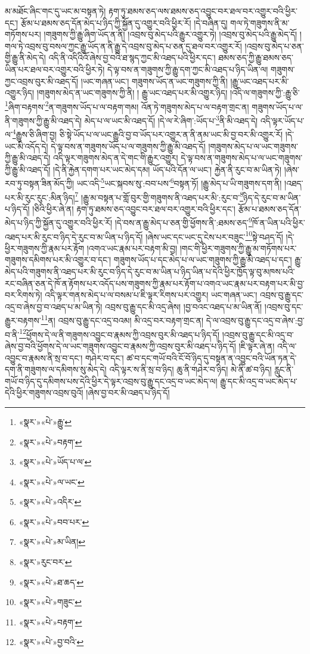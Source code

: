 མ་མཐོང་ཞིང་གང་དུ་ཡང་མ་བསྟན་ཏེ། རྟག་ཏུ་ཐམས་ཅད་ལས་ཐམས་ཅད་འབྱུང་བར་ཐལ་བར་འགྱུར་བའི་ཕྱིར་དང་། རྩོམ་པ་ཐམས་ཅད་དོན་མེད་པ་ཉིད་ཀྱི་སྐྱོན་དུ་འགྱུར་བའི་ཕྱིར་རོ། །དེ་བཞིན་དུ། གལ་ཏེ་གཟུགས་ནི་མ་གཏོགས་པར། །གཟུགས་ཀྱི་རྒྱུ་ཞིག་ཡོད་ན་ནི། །འབྲས་བུ་མེད་པའི་རྒྱུར་འགྱུར་ཏེ། །འབྲས་བུ་མེད་པའི་རྒྱུ་མེད་དོ། །གལ་ཏེ་འབྲས་བུ་བསལ་ཀྱང་རྒྱུ་ཡོད་ན་ནི་རྒྱུ་དེ་འབྲས་བུ་མེད་པ་ཅན་དུ་ཐལ་བར་འགྱུར་རོ། །འབྲས་བུ་མེད་པ་ཅན་གྱི་རྒྱུ་ནི་མེད་དེ། འདི་ནི་འདིའིའོ་ཞེས་བྱ་བའི་ཐ་སྙད་ཀྱང་མི་འཐད་པའི་ཕྱིར་དང་། ཐམས་ཅད་ཀྱི་རྒྱུ་ཐམས་ཅད་ཡིན་པར་ཐལ་བར་འགྱུར་བའི་ཕྱིར་ཏེ། དེ་ལྟ་བས་ན་གཟུགས་ཀྱི་རྒྱུ་དག་ཀྱང་མི་འཐད་པ་ཉིད་ཡིན་ལ། གཟུགས་ཀྱང་འབྲས་བུར་མི་འཐད་དོ། །ཡང་གཞན་ཡང་། གཟུགས་ཡོད་ན་ཡང་གཟུགས་ཀྱི་ནི། །རྒྱུ་ཡང་འཐད་པར་མི་འགྱུར་ཉིད། །གཟུགས་མེད་ན་ཡང་གཟུགས་ཀྱི་ནི། །
རྒྱུ་ཡང་འཐད་པར་མི་འགྱུར་ཉིད། །འདི་ལ་གཟུགས་ཀྱི་:རྒྱུ་ཅི་\footnote{«སྣར་»«པེ་»རྒྱུ་}ཞིག་བརྟགས་\footnote{«སྣར་»«པེ་»བརྟག་}ན་གཟུགས་ཡོད་པ་ལ་བརྟག་གམ། འོན་ཏེ་གཟུགས་མེད་པ་ལ་བརྟག་གྲང་ན། གཟུགས་ཡོད་པ་ལ་ནི་གཟུགས་ཀྱི་རྒྱུ་མི་འཐད་དེ། མེད་པ་ལ་ཡང་མི་འཐད་དོ། །དེ་ལ་རེ་ཞིག་:ཡོད་པ་\footnote{«སྣར་»«པེ་»ཡོད་པ་ལ་}ནི་མི་འཐད་དེ། འདི་ལྟར་ཡོད་པ་ལ་\footnote{«སྣར་»«པེ་»ལ་ཡང་}རྒྱུས་ཅི་ཞིག་བྱ། ཅི་སྟེ་ཡོད་པ་ལ་ཡང་རྒྱུའི་བྱ་བ་ཡོད་པར་འགྱུར་ན་ནི་ནམ་ཡང་མི་བྱ་བར་མི་འགྱུར་རོ། །དེ་ཡང་མི་འདོད་དེ། དེ་ལྟ་བས་ན་གཟུགས་ཡོད་པ་ལ་གཟུགས་ཀྱི་རྒྱུ་མི་འཐད་དོ། །གཟུགས་མེད་པ་ལ་ཡང་གཟུགས་ཀྱི་རྒྱུ་མི་འཐད་དེ། འདི་ལྟར་གཟུགས་མེད་ན་དེ་གང་གི་རྒྱུར་འགྱུར། དེ་ལྟ་བས་ན་གཟུགས་མེད་པ་ལ་ཡང་གཟུགས་ཀྱི་རྒྱུ་མི་འཐད་དོ། །དེ་ནི་རྐྱེན་དགག་པར་ཡང་མེད་དམ། ཡོད་པའི་དོན་ལ་ཡང་། རྐྱེན་ནི་རུང་བ་མ་ཡིན་ཏེ། །ཞེས་རབ་ཏུ་བསྟན་ཟིན་མོད་ཀྱི། ཡང་འདི་\footnote{«སྣར་»«པེ་»འདིར་}ཡང་སྐབས་སུ་:བབ་པས་\footnote{«སྣར་»«པེ་»བབ་པར་}བསྟན་ཏོ། །རྒྱུ་མེད་པ་ཡི་གཟུགས་དག་ནི། །འཐད་པར་མི་རུང་རུང་:མིན་ཉིད།\footnote{«སྣར་»«པེ་»མ་ཡིན།} །རྒྱུ་མ་བསྟན་པ་གློ་བུར་གྱི་གཟུགས་ནི་འཐད་པར་མི་:རུང་བ་\footnote{«སྣར་»རུང་བར་}ཉིད་དེ་རུང་བ་མ་ཡིན་པ་ཉིད་དོ། །ཅིའི་ཕྱིར་ཞེ་ན། རྟག་ཏུ་ཐམས་ཅད་འབྱུང་བར་ཐལ་བར་འགྱུར་བའི་ཕྱིར་དང་། རྩོམ་པ་ཐམས་ཅད་དོན་མེད་པ་ཉིད་ཀྱི་སྐྱོན་དུ་འགྱུར་བའི་ཕྱིར་རོ། །དེ་བས་ན་རྒྱུ་མེད་པ་ཅན་གྱི་ཕྱོགས་ནི་:ཐམས་ཅད་\footnote{«སྣར་»«པེ་»ཐ་ཆད་}ཁོ་ན་ཡིན་པའི་ཕྱིར་འཐད་པར་མི་རུང་བ་ཉིད་དེ་རུང་བ་མ་ཡིན་པ་ཉིད་དོ། །ཞེས་ཡང་དང་ཡང་དུ་ངེས་པར་བཟུང་\footnote{«སྣར་»«པེ་»གཟུང་}སྟེ་བཤད་དོ། །དེ་ཕྱིར་གཟུགས་ཀྱི་རྣམ་པར་རྟོག །འགའ་ཡང་རྣམ་པར་བརྟག་མི་བྱ། །གང་གི་ཕྱིར་གཟུགས་ཀྱི་རྒྱུ་མ་གཏོགས་པར་གཟུགས་དམིགས་པར་མི་འགྱུར་བ་དང་། གཟུགས་ཡོད་པ་དང་མེད་པ་ལ་ཡང་གཟུགས་ཀྱི་རྒྱུ་མི་འཐད་པ་དང་། རྒྱུ་མེད་པའི་གཟུགས་ནི་འཐད་པར་མི་རུང་བ་ཉིད་དེ་རུང་བ་མ་ཡིན་པ་ཉིད་ཡིན་པ་དེའི་ཕྱིར་ཁྱོད་ལྟ་བུ་མཁས་པའི་རང་བཞིན་ཅན་དེ་ཁོ་ན་རྟོགས་པར་འདོད་པས་གཟུགས་ཀྱི་རྣམ་པར་རྟོག་པ་འགའ་ཡང་རྣམ་པར་བརྟག་པར་མི་བྱ་བར་རིགས་ཏེ། འདི་ལྟར་གནས་མེད་པ་ལ་བསམ་པ་ཇི་ལྟར་རིགས་པར་འགྱུར། ཡང་གཞན་ཡང་། འབྲས་བུ་རྒྱུ་དང་འདྲ་བ་ཞེས་བྱ་བ་འཐད་པ་མ་ཡིན་ཏེ། འབྲས་བུ་རྒྱུ་དང་མི་འདྲ་ཞེས། །བྱ་བའང་འཐད་པ་མ་ཡིན་ནོ། །འབྲས་བུ་དང་རྒྱུར་བརྟགས་\footnote{«སྣར་»«པེ་»བརྟག་}ན། འབྲས་བུ་རྒྱུ་དང་འདྲ་བའམ། མི་འདྲ་བར་བརྟག་གྲང་ན། དེ་ལ་འབྲས་བུ་རྒྱུ་དང་འདྲ་བ་ཞེས་:བྱ་བ་ནི་\footnote{«སྣར་»«པེ་»བྱ་བའི་}ཕྱོགས་དེ་ལ་ནི་གཟུགས་འབྱུང་བ་རྣམས་ཀྱི་འབྲས་བུར་མི་འཐད་པ་ཉིད་དོ། །འབྲས་བུ་རྒྱུ་དང་མི་འདྲ་བ་ཞེས་བྱ་བའི་ཕྱོགས་དེ་ལ་ཡང་གཟུགས་འབྱུང་བ་རྣམས་ཀྱི་འབྲས་བུར་མི་འཐད་པ་ཉིད་དོ། །ཇི་ལྟར་ཞེ་ན། འདི་ལ་འབྱུང་བ་རྣམས་ནི་སྲ་བ་དང་། གཤེར་བ་དང་། ཚ་བ་དང་གཡོ་བའི་ངོ་བོ་ཉིད་དུ་བསྟན་ན་འབྱུང་བའི་ཡོན་ཏན་དེ་དག་ནི་གཟུགས་ལ་དམིགས་སུ་མེད་དེ། འདི་ལྟར་ས་ནི་སྲ་བ་ཉིད། ཆུ་ནི་གཤེར་བ་ཉིད། མེ་ནི་ཚ་བ་ཉིད། རླུང་ནི་གཡོ་བ་ཉིད་དུ་དམིགས་པས་དེའི་ཕྱིར་དེ་ལྟར་འབྲས་བུ་རྒྱུ་དང་འདྲ་བ་ཡང་མེད་ལ། རྒྱུ་དང་མི་འདྲ་བ་ཡང་མེད་པ་དེའི་ཕྱིར་གཟུགས་འབྲས་བུའོ། །ཞེས་བྱ་བར་མི་འཐད་པ་ཉིད་དོ། 